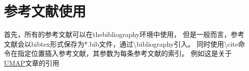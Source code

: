 \section{参考文献使用}
首先，所有的参考文献可以在thebibliography环境中使用，
但是一般而言，参考文献会以bibtex形式保存为*.bib文件，通过\textbackslash bibliography引入。
同时使用\textbackslash cite命令在指定位置插入参考文献，其参数为每条参考文献的索引。
例如这是关于\href{https://arxiv.org/abs/1802.03426}{UMAP}文章的引用\cite{umap2018}